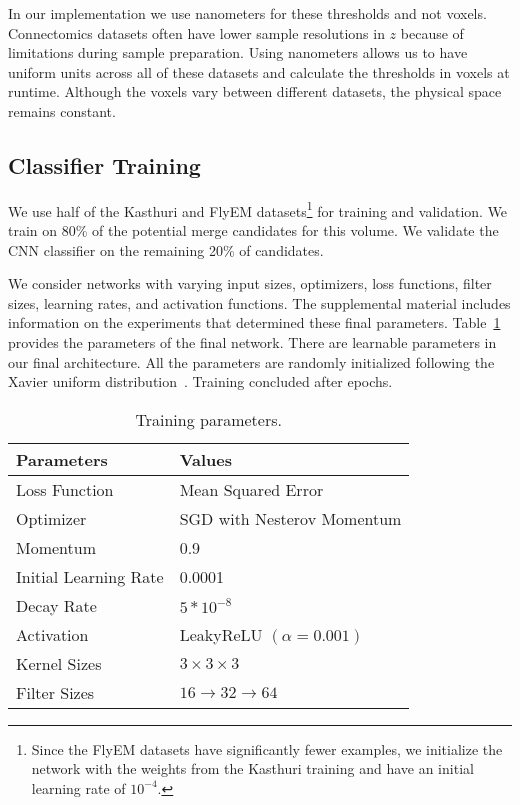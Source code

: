 In our implementation we use nanometers for these thresholds and not voxels. 
Connectomics datasets often have lower sample resolutions in $z$ because of limitations during sample preparation. 
Using nanometers allows us to have uniform units across all of these datasets and calculate the thresholds in voxels at runtime.
Although the voxels vary between different datasets, the physical space remains constant. 


\subsection{Classifier Training}
\label{sec:network-parameters}

We use half of the Kasthuri and FlyEM datasets\footnote{Since the FlyEM datasets have significantly fewer examples, we initialize the network with the weights from the Kasthuri training and have an initial learning rate of $10^{-4}$.} for training and validation. 
We train on 80\% of the potential merge candidates for this volume.
We validate the CNN classifier on the remaining 20\% of candidates. 


We consider networks with varying input sizes, optimizers, loss functions, filter sizes, learning rates, and activation functions. 
The supplemental material includes information on the experiments that determined these final parameters. 
Table~\ref{table:architecture} provides the parameters of the final network. 
There are  learnable parameters in our final architecture. 
All the parameters are randomly initialized following the Xavier uniform distribution~\cite{glorot2010understanding}. 
Training concluded after  epochs.

\begin{table}[h!]
	\centering
	\begin{tabular}{l l} \hline
		\textbf{Parameters} & \textbf{Values} \\ \hline
		Loss Function & Mean Squared Error \\
		Optimizer & SGD  with Nesterov Momentum \\
		Momentum & 0.9 \\
		Initial Learning Rate & 0.0001 \\
		Decay Rate & $5 * 10^{-8}$ \\
		Activation & LeakyReLU $(\alpha = 0.001)$ \\
		Kernel Sizes & $3 \times 3 \times 3$ \\
		Filter Sizes & $16 \to 32 \to 64$ \\ \hline
	\end{tabular}
	\caption{Training parameters.}
	\label{table:architecture}
\end{table}


